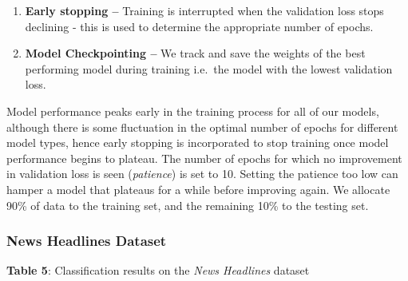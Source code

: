 \documentclass[12pt,a4paper]{article}
\begin{document}
\begin{enumerate}
	\item \textbf{Early stopping --} Training is interrupted when the validation loss stops declining - this is used to determine the appropriate number of epochs.\vspace{-8pt}
	\item \textbf{Model Checkpointing --} We track and save the weights of the best performing model during training i.e.\ the model with the lowest validation loss.
\end{enumerate}\vspace{-4pt}

\noindent Model performance peaks early in the training process for all of our models, although there is some fluctuation in the optimal number of epochs for different model types, hence early stopping is incorporated to stop training once model performance begins to plateau. The number of epochs for which no improvement in validation loss is seen (\textit{patience}) is set to 10. Setting the patience too low can hamper a model that plateaus for a while before improving again. We allocate 90\% of data to the training set, and the remaining 10\% to the testing set.

\subsubsection{News Headlines Dataset}
\begin{center}
	\textbf{Table 5}: Classification results on the \textit{News Headlines} dataset
\end{center}
\end{document}
